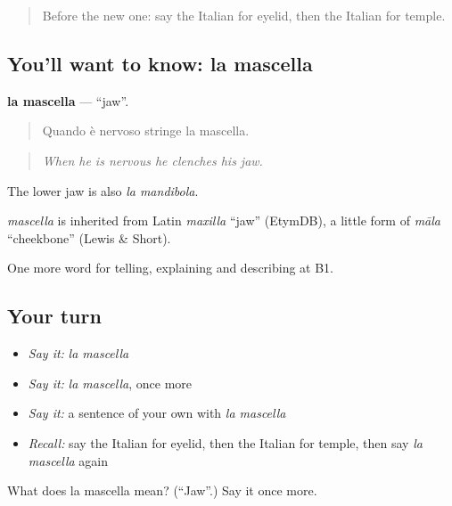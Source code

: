 \label{lesson:IT-C482-mascella}



\begin{quote}
Before the new one: say the Italian for eyelid, then the Italian for temple.
\end{quote}

\subsection*{You'll want to know: la mascella}
\textbf{la mascella} — \textquotedblleft{}jaw\textquotedblright{}.

\begin{quote}
Quando è nervoso stringe la mascella.
\end{quote}

\begin{quote}
\emph{When he is nervous he clenches his jaw.}
\end{quote}

The lower jaw is also \emph{la mandibola}.

\begin{cousinweb}
\emph{mascella} is inherited from Latin \emph{maxilla} \textquotedblleft{}jaw\textquotedblright{} (EtymDB), a little form of \emph{māla} \textquotedblleft{}cheekbone\textquotedblright{} (Lewis \& Short).
\end{cousinweb}

\begin{grammarlens}[title={What you've built}]
One more word for telling, explaining and describing at B1.
\end{grammarlens}

\subsection*{Your turn}
\begin{itemize}
\raggedright
  \item \emph{Say it:} \emph{la mascella}
  \item \emph{Say it:} \emph{la mascella}, once more
  \item \emph{Say it:} a sentence of your own with \emph{la mascella}
  \item \emph{Recall:} say the Italian for eyelid, then the Italian for temple, then say \emph{la mascella} again
\end{itemize}

\begin{tcolorbox}[breakable,colback=teal!4,colframe=teal!35!black,title={Before you move on}]
What does la mascella mean? (\textquotedblleft{}Jaw\textquotedblright{}.) Say it once more.
\end{tcolorbox}
